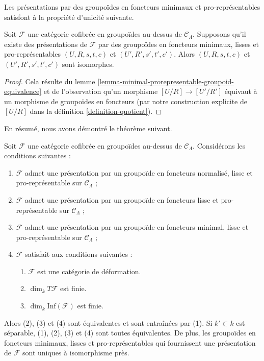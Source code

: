 \noindent
Les présentations par des groupoïdes en foncteurs minimaux et pro-représentables
satisfont à la propriété d'unicité suivante.

\begin{lemma}
\label{lemma-minimal-presentations-equivalent}
Soit $\mathcal{F}$ une catégorie cofibrée en groupoïdes au-dessus de
$\mathcal{C}_\Lambda$. Supposons qu'il existe des présentations de
$\mathcal{F}$ par des groupoïdes en foncteurs minimaux, lisses et
pro-représentables $(U, R, s, t, c)$ et $(U', R', s', t', c')$. Alors
$(U, R, s, t, c)$ et $(U', R', s', t', c')$ sont isomorphes.
\end{lemma}

\begin{proof}
Cela résulte du lemme
\ref{lemma-minimal-prorepresentable-groupoid-equivalence} et de l'observation
qu'un morphisme $[U/R] \to [U'/R']$ équivaut à un morphisme de groupoïdes en
foncteurs (par notre construction explicite de $[U/R]$ dans la définition
\ref{definition-quotient}).
\end{proof}

\noindent
En résumé, nous avons démontré le théorème suivant.

\begin{theorem}
\label{theorem-minimal-smooth-prorepresentable-presentations}
Soit $\mathcal{F}$ une catégorie cofibrée en groupoïdes au-dessus de
$\mathcal{C}_\Lambda$. Considérons les conditions suivantes :
\begin{enumerate}
\item $\mathcal{F}$ admet une présentation par un groupoïde en foncteurs normalisé,
lisse et pro-représentable sur $\mathcal{C}_\Lambda$ ;
\item $\mathcal{F}$ admet une présentation par un groupoïde en foncteurs lisse
et pro-représentable sur $\mathcal{C}_\Lambda$ ;
\item $\mathcal{F}$ admet une présentation par un groupoïde en foncteurs minimal,
lisse et pro-représentable sur $\mathcal{C}_\Lambda$ ;
\item $\mathcal{F}$ satisfait aux conditions suivantes :
\begin{enumerate}
\item $\mathcal{F}$ est une catégorie de déformation.
\item $\dim_k T\mathcal{F}$ est finie.
\item $\dim_k \text{Inf}(\mathcal{F})$ est finie.
\end{enumerate}
\end{enumerate}
Alors (2), (3) et (4) sont équivalentes et sont entraînées par (1). Si
$k' \subset k$ est séparable, (1), (2), (3) et (4) sont toutes équivalentes.
De plus, les groupoïdes en foncteurs minimaux, lisses et pro-représentables qui
fournissent une présentation de $\mathcal{F}$ sont uniques à isomorphisme près.
\end{theorem}

